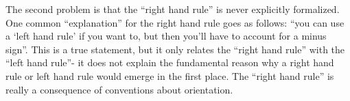 The second problem is that the ``right hand rule'' is never explicitly formalized. One common ``explanation'' for the right hand rule goes as follows: ``you can use a `left hand rule' if you want to, but then you'll have to account for a minus sign''. This is a true statement, but it only relates the ``right hand rule'' with the ``left hand rule''- it does not explain the fundamental reason why a right hand rule or left hand rule would emerge in the first place. The ``right hand rule'' is really a consequence of conventions about orientation.

\begin{comment}
\begin{lemma}
\label{ch::lin_alg::thm::dot_prod_cancelable}
    (The algebraic dot product on $\R^n$ is positive definite, and therefore cancelable).
    
    The algebraic dot product on $\R^n$ is \textit{positive definite}; that is, it satisfies the property ${(\vv \cdot \vv = 0 \iff \vv = \mathbf{0})}$.
    
    As a consequence, we have the fact that, when $\vv \in \R^n$ is nonzero and $\vv_1, \vv_2 \in \R^n$, then ${((\vv_1 \cdot \vv = \vv_2 \cdot \vv) \implies \vv_1 = \vv_2)}$.
\end{lemma}

\begin{proof}
   We first show that the dot product on $\R^n$ satisfies the property $(\vv \cdot \vv = 0 \iff \vv = \mathbf{0})$. The reverse implication follows immediately. For the forward implication, let $\vv \in \R^n$, and suppose $\vv \cdot \vv = 0$; we must show $\vv = \mathbf{0}$. We have $\vv \cdot \vv = \sum_{i = 1}^n ([\vv]_\sE)_i^2$. Each term in the sum is a nonnegative number. Therefore, the sum is only zero if all terms in the sum are zero, so $([\vv]_\sE)_i = 0$ for each $i$, which means $\vv = \mathbf{0}$.
   
   Now we show that when $\vv \in \R^n$ is nonzero and $\vv_1, \vv_2 \in \R^n$, then $((\vv_1 \cdot \vv = \vv_2 \cdot \vv) \implies \vv_1 = \vv_2)$. If $\vv_1 \cdot \vv = \vv_2 \cdot \vv$, then $(\vv_1 - \vv_2) \cdot \vv = \mathbf{0}$ by the bilinearity of $\cdot$. Since $\vv \neq \mathbf{0}$, then we must have $\vv_1 - \vv_2 = \mathbf{0}$ due to the positive definiteness of $\cdot$. That is, $\vv_1 = \vv_2$.
\end{proof}
\end{comment}

